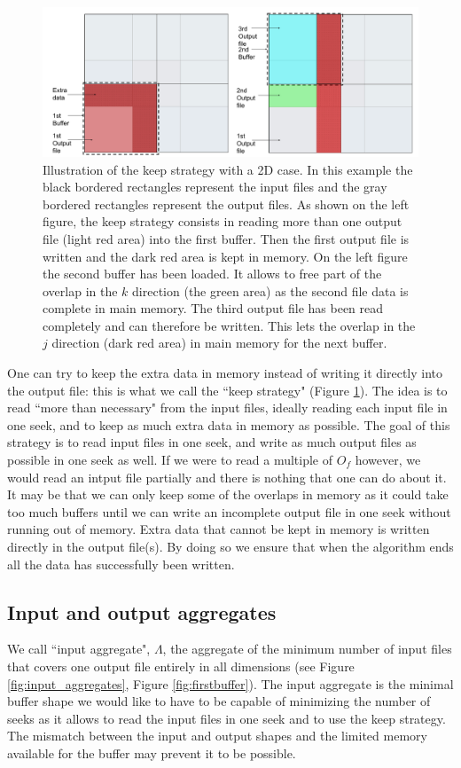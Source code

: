 \documentclass[conference]{IEEEtran}
\begin{document}
\begin{figure}[h]
\centering
\includegraphics[scale=0.2]{./figures/keep_strategy.png}
\caption{Illustration of the keep strategy with a 2D case. In this example the black bordered rectangles represent the input files and the gray bordered rectangles represent the output files. As shown on the left figure, the keep strategy consists in reading more than one output file (light red area) into the first buffer. Then the first output file is written and the dark red area is kept in memory. On the left figure the second buffer has been loaded. It allows to free part of the overlap in the $k$ direction (the green area) as the second file data is complete in main memory. The third output file has been read completely and can therefore be written. This lets the overlap in the $j$ direction (dark red area) in main memory for the next buffer.
}
\label{fig:keepstrategy}
\end{figure}

One can try to keep the extra data in memory instead of writing it directly into the output file: this is what we call the ``keep strategy" (Figure \ref{fig:keepstrategy}).
The idea is to read ``more than necessary" from the input files, ideally reading each input file in one seek, and to keep as much extra data in memory as possible.
The goal of this strategy is to read input files in one seek, and write as much output files as possible in one seek as well.
If we were to read a multiple of $O_f$ however, we would read an intput file partially and there is nothing that one can do about it.
It may be that we can only keep some of the overlaps in memory as it could take too much buffers until we can write an incomplete output file in one seek without running out of memory.
Extra data that cannot be kept in memory is written directly in the output file(s).
By doing so we ensure that when the algorithm ends all the data has successfully been written.

\subsection{Input and output aggregates}
We call ``input aggregate", $\Lambda$, the aggregate of the minimum number of input files that covers one output file entirely in all dimensions (see Figure \ref{fig:input_aggregates}, Figure \ref{fig:firstbuffer}).
The input aggregate is the minimal buffer shape we would like to have to be capable of minimizing the number of seeks as it allows to read the input files in one seek and to use the keep strategy.
The mismatch between the input and output shapes and the limited memory available for the buffer may prevent it to be possible. \\
\end{document}
